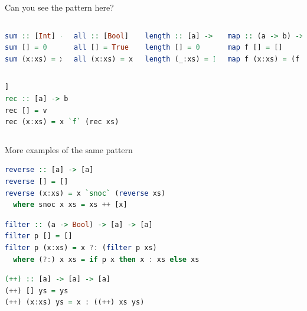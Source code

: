 \documentclass[lualatex]{beamer}
\renewcommand{\_}{\textscale{.6}{\textunderscore}}
\begin{document}
\begin{frame}[fragile]{Can you see the pattern here?}
\begin{columns}
\begin{lstlisting}[language=Haskell]
sum :: [Int] -> Int
sum [] = 0
sum (x:xs) = x + (sum xs)
\end{lstlisting}
\pause
\begin{lstlisting}[language=Haskell]
all :: [Bool] -> Bool
all [] = True
all (x:xs) = x && (all xs)
\end{lstlisting}
\pause
{}
\begin{lstlisting}[language=Haskell, morekeywords={foldr}]
length :: [a] -> Int
length [] = 0
length (_:xs) = 1 + (length xs)
\end{lstlisting}
\pause
\begin{lstlisting}[language=Haskell, morekeywords={foldr}]
map :: (a -> b) -> [a] -> [b]
map f [] = []
map f (x:xs) = (f x) : (map f xs)
\end{lstlisting}
\end{columns}
\begin{columns}
\begin{center}
\pause
\begin{lstlisting}[language=Haskell, morekeywords={rec}]]
rec :: [a] -> b
rec [] = v
rec (x:xs) = x `f` (rec xs)
\end{lstlisting}
\end{center}
\end{columns}
\end{frame}

\begin{frame}[fragile]{More examples of the same pattern}
\begin{lstlisting}[language=Haskell, morekeywords={foldr}]
reverse :: [a] -> [a]
reverse [] = []
reverse (x:xs) = x `snoc` (reverse xs)
  where snoc x xs = xs ++ [x]
\end{lstlisting}
\pause
\begin{lstlisting}[language=Haskell, morekeywords={foldr}]
filter :: (a -> Bool) -> [a] -> [a]
filter p [] = []
filter p (x:xs) = x ?: (filter p xs)
  where (?:) x xs = if p x then x : xs else xs
\end{lstlisting}
\pause
\begin{lstlisting}[language=Haskell, morekeywords={foldr}]
(++) :: [a] -> [a] -> [a]
(++) [] ys = ys
(++) (x:xs) ys = x : ((++) xs ys)
\end{lstlisting}
\end{frame}
\end{document}
